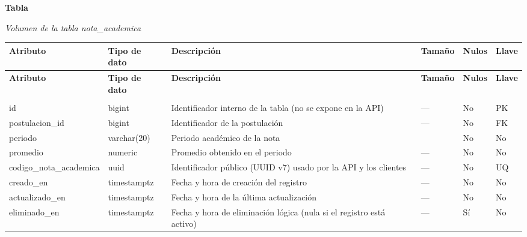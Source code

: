 \label{tab:volumen_nota_academica}
\noindent\textbf{Tabla~\thetable}\par\nopagebreak
\noindent\textit{Volumen de la tabla nota\_\allowbreak{}academica}\par\nopagebreak
\begingroup\small\linespread{1}\selectfont\setlength{\tabcolsep}{4pt}
\begin{longtable}{>{\raggedright\arraybackslash}p{3.4cm} >{\raggedright\arraybackslash}p{2.5cm} >{\raggedright\arraybackslash}p{4.8cm} >{\centering\arraybackslash}p{1.6cm}>{\centering\arraybackslash}p{1.1cm} >{\centering\arraybackslash}p{1.3cm}}
\toprule
\textbf{Atributo} & \textbf{Tipo de dato} & \textbf{Descripción} & \textbf{Tamaño} & \textbf{Nulos} & \textbf{Llave} \\
\midrule
\endfirsthead
\toprule
\textbf{Atributo} & \textbf{Tipo de dato} & \textbf{Descripción} & \textbf{Tamaño} & \textbf{Nulos} & \textbf{Llave} \\
\midrule
\endhead
\endfoot
\bottomrule
\multicolumn{6}{l}{\textit{Nota.} Elaboración propia.} \\
\endlastfoot
id & bigint & Identificador interno de la tabla (no se expone en la API) & — & No & PK \\
postulacion\_\allowbreak{}id & bigint & Identificador de la postulación & — & No & FK \\
periodo & varchar(20) & Periodo académico de la nota & 20 & No & No \\
promedio & numeric & Promedio obtenido en el periodo & — & No & No \\
codigo\_\allowbreak{}nota\_\allowbreak{}academica & uuid & Identificador público (UUID v7) usado por la API y los clientes & — & No & UQ \\
creado\_\allowbreak{}en & timestamptz & Fecha y hora de creación del registro & — & No & No \\
actualizado\_\allowbreak{}en & timestamptz & Fecha y hora de la última actualización & — & No & No \\
eliminado\_\allowbreak{}en & timestamptz & Fecha y hora de eliminación lógica (nula si el registro está activo) & — & Sí & No \\
\end{longtable}
\endgroup
\addtocounter{table}{-1}

